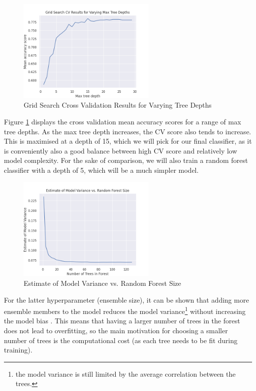 \begin{figure}[!ht]
\begin{center}
\includegraphics[width=0.6\textwidth]{fig/grid_search_cv_random_forest.png}
\end{center}
\caption{Grid Search Cross Validation Results for Varying Tree Depths}
\label{randomforestgridsearchcv}
\end{figure}

Figure \ref{randomforestgridsearchcv} displays the cross validation mean accuracy scores for a range of max tree depths. As the max tree depth increases, the CV score also tends to increase. This is maximised at a depth of 15, which we will pick for our final classifier, as it is conveniently also a good balance between high CV score and relatively low model complexity. For the sake of comparison, we will also train a random forest classifier with a depth of 5, which will be a much simpler model.

\begin{figure}[!ht]
\begin{center}
\includegraphics[width=0.6\textwidth]{fig/model_variance_random_forest.png}
\end{center}
\caption{Estimate of Model Variance vs. Random Forest Size}
\label{randomforestvariance}
\end{figure}

For the latter hyperparameter (ensemble size), it can be shown that adding more ensemble members to the model reduces the model variance\footnote{the model variance is still limited by the average correlation between the trees.} without increasing the model bias \parencite{smlbook}. This means that having a larger number of trees in the forest does not lead to overfitting, so the main motivation for choosing a smaller number of trees is the computational cost (as each tree needs to be fit during training).

